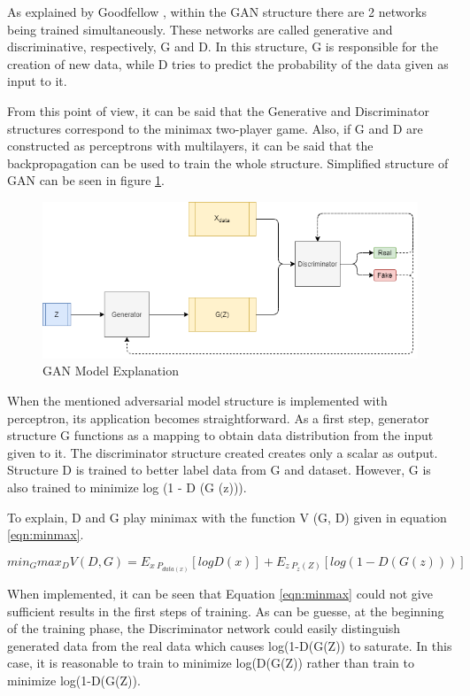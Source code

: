 As explained by Goodfellow \cite{gan}, within the GAN structure there are 2 networks being trained simultaneously. These networks are called generative and discriminative, respectively, G and D. In this structure, G is responsible for the creation of new data, while D tries to predict the probability of the data given as input to it.

From this point of view, it can be said that the Generative and Discriminator structures correspond to the minimax two-player game. Also, if G and D are constructed as perceptrons with multilayers, it can be said that the backpropagation can be used to train the whole structure. Simplified structure of GAN can be seen in figure \ref{fig:ganstruct}.

\begin{figure}[h]
    \centering
    \includegraphics[scale=0.55]{figures/chapter3/GAN.png}
    \vspace*{3mm}
    \caption{GAN Model Explanation}
    \label{fig:ganstruct}
\end{figure}

When the mentioned adversarial model structure is implemented with perceptron, its application becomes straightforward. As a first step, generator structure G functions as a mapping to obtain data distribution from the input given to it. The discriminator structure created creates only a scalar as output. Structure D is trained to better label data from G and dataset. However, G is also trained to minimize log (1 - D (G (z))).

To explain, D and G play minimax with the function V (G, D) given in equation \ref{eqn:minmax}.

\begin{equation}
\label{eqn:minmax}
    min_Gmax_D V(D,G)= E_{x~P_{data(x)}}[logD(x)]+E_{z~P_{z}(Z)}[log(1-D(G(z)))]
\end{equation}

When implemented, it can be seen that Equation \ref{eqn:minmax} could not give sufficient results in the first steps of training. As can be guesse, at the beginning of the training phase, the Discriminator network could easily distinguish generated data from the real data which causes log(1-D(G(Z)) to saturate. In this case, it is reasonable to train to minimize log(D(G(Z)) rather than train to minimize log(1-D(G(Z)).

